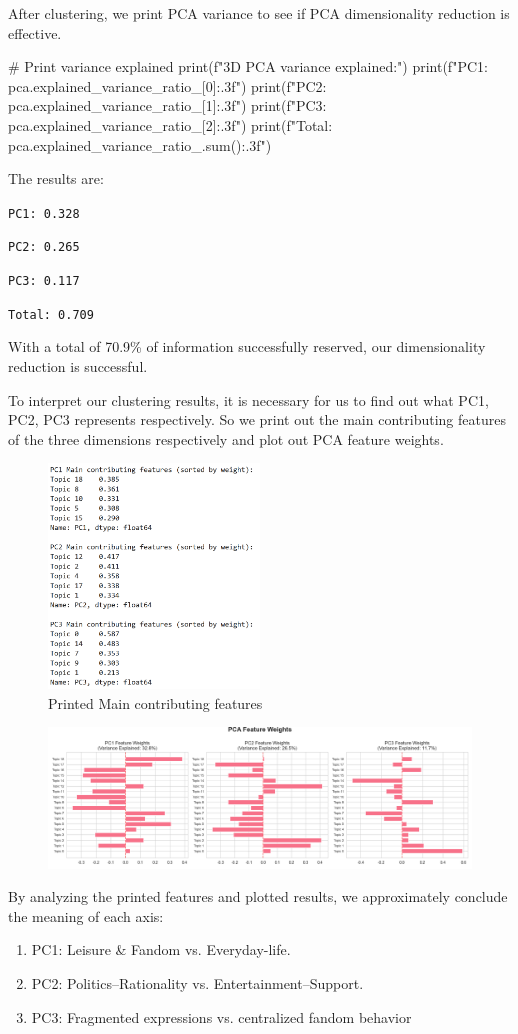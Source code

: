 \documentclass[12pt]{article}
\numberwithin{figure}{section}  %
\begin{document}
	After clustering, we print PCA variance to see if PCA dimensionality
	reduction is effective.
	\begin{python}
# Print variance explained
print(f"3D PCA variance explained:")
print(f"PC1: {pca.explained_variance_ratio_[0]:.3f}")
print(f"PC2: {pca.explained_variance_ratio_[1]:.3f}")  
print(f"PC3: {pca.explained_variance_ratio_[2]:.3f}")
print(f"Total: {pca.explained_variance_ratio_.sum():.3f}")
	\end{python}
	
	The results are:
	
	\texttt{PC1: 0.328}
	
	\texttt{PC2: 0.265}
	
	\texttt{PC3: 0.117}
	
	\texttt{Total: 0.709}
	
	With a total of 70.9\% of information successfully reserved, our
	dimensionality reduction is successful.
	
	To interpret our clustering results, it is necessary for us to find out what
	PC1, PC2, PC3 represents respectively. So we print out the main contributing
	features of the three dimensions respectively and plot out PCA feature
	weights.
	\begin{figure}[H]
		\centering
		\includegraphics[width=0.5\textwidth]{Q2PCA1} 
		\caption{\centering Printed Main contributing features}		
	\end{figure}	
	\begin{figure}[H]
			\centering
			\includegraphics[width=1\textwidth]{Q2PCA2} 		
	\end{figure}
	By analyzing the printed features and plotted results, we approximately
	conclude the meaning of each axis:
	\begin{enumerate}
	\item PC1: Leisure \& Fandom vs. Everyday-life.
	\item PC2: Politics–Rationality vs. Entertainment–Support.
	\item PC3: Fragmented expressions vs. centralized fandom behavior
	\end{enumerate}
	
\end{document}
